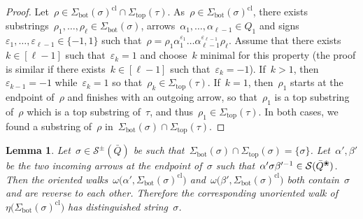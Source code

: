 \documentclass{amsart}
\newtheorem{lemma}[theorem]{Lemma}
\theoremstyle{definition}
\newcommand{\blossom}{^\text{\ding{96}}} %
\newcommand{\strings}{\mathcal{S}} %
\renewcommand{\top}{\mathrm{top}} %
\newcommand{\bottom}{\mathrm{bot}} %
\newcommand{\closure}[1]{#1^{\mathrm{cl}}} %
\begin{document}
\begin{proof}
Let~$\rho \in \closure{\Sigma_\bottom(\sigma)} \cap \Sigma_\top(\tau)$.
As~$\rho \in \closure{\Sigma_\bottom(\sigma)}$, there exists substrings~$\rho_1, \dots, \rho_\ell \in \Sigma_\bottom(\sigma)$, arrows~$\alpha_1, \dots, \alpha_{\ell-1} \in Q_1$ and signs~$\varepsilon_1, \dots, \varepsilon_{\ell-1} \in \{-1,1\}$ such that~$\rho = \rho_1 \alpha_1^{\varepsilon_1} \dots \alpha_{\ell-1}^{\varepsilon_{\ell-1}} \rho_\ell$.
Assume that there exists~$k \in [\ell-1]$ such that~$\varepsilon_k = 1$ and choose~$k$ minimal for this property (the proof is similar if there exists~$k \in [\ell-1]$ such that~$\varepsilon_k = -1$).
If~$k > 1$, then~$\varepsilon_{k-1} = -1$ while~$\varepsilon_k = 1$ so that~$\rho_k \in \Sigma_\top(\tau)$.
If~$k = 1$, then~$\rho_1$ starts at the endpoint of~$\rho$ and finishes with an outgoing arrow, so that~$\rho_1$ is a top substring of~$\rho$ which is a top substring of~$\tau$, and thus~$\rho_1 \in \Sigma_\top(\tau)$.
In both cases, we found a substring of~$\rho$ in~$\Sigma_\bottom(\sigma) \cap \Sigma_\top(\tau)$.
\end{proof}

\begin{lemma}
\label{lem:bijectionDistinguishableStringsWalks}
Let~$\sigma \in \strings^\pm(\bar Q)$ be such that~$\Sigma_\bottom(\sigma) \cap \Sigma_\top(\sigma) = \{\sigma\}$.
Let~$\alpha', \beta'$ be the two incoming arrows at the endpoint of~$\sigma$ such that~$\alpha'\sigma\beta'^{-1} \in \strings(\bar Q\blossom)$.
Then the oriented walks~$\omega \big( \alpha', \closure{\Sigma_\bottom(\sigma)} \big)$ and~$\omega \big( \beta', \closure{\Sigma_\bottom(\sigma)} \big)$ both contain~$\sigma$ and are reverse to each other. Therefore the corresponding unoriented walk of~$\eta \big( \closure{\Sigma_\bottom(\sigma)} \big)$ has distinguished string~$\sigma$.
\end{lemma}
\end{document}
